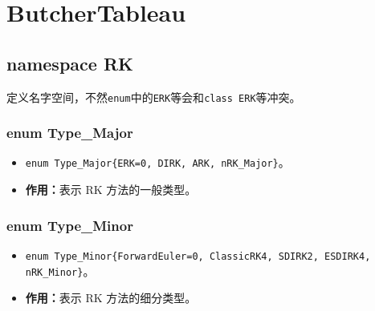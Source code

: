\documentclass[a4paper,twoside]{ctexart}
\begin{document}
\section{ButcherTableau}
\subsection{namespace RK}
定义名字空间，不然\texttt{enum}中的\texttt{ERK}等会和\texttt{class ERK}等冲突。
\subsubsection{enum Type\_Major}
\begin{itemize}
    \item \texttt{enum Type\_Major\{ERK=0, DIRK, ARK, nRK\_Major\}}。
    \item \textbf{作用：}表示 RK 方法的一般类型。
\end{itemize}

\subsubsection{enum Type\_Minor}
\begin{itemize}
    \item \texttt{enum Type\_Minor\{ForwardEuler=0, ClassicRK4, SDIRK2, ESDIRK4, nRK\_Minor\}}。
    \item \textbf{作用：}表示 RK 方法的细分类型。
\end{itemize}
\end{document}

